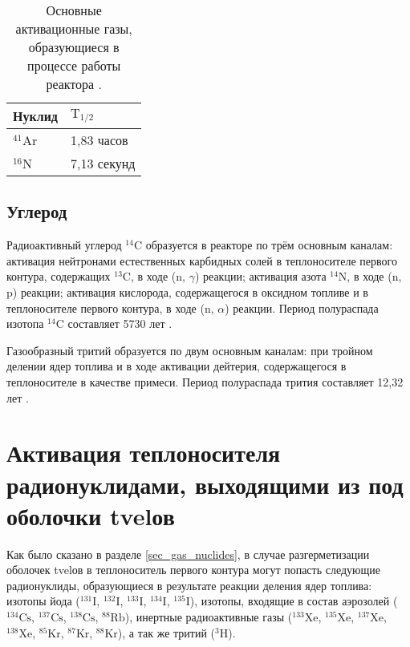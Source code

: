 \begin{table}[ht]
    \setlength{\extrarowheight}{1mm}
    \caption{Основные активационные газы, образующиеся в процессе работы реактора 
        \cite{bekman_nuclear}.}
    \label{table_active_gas}
    \centering
    \begin{tabular}{|M{0.4\textwidth}|M{0.4\textwidth}|}
    \hline Нуклид & $\text{T}_{1/2}$ \\
    \hline $^{41}\text{Ar}$ & 1,83 часов \\
    \hline $^{16}\text{N}$ & 7,13 секунд \\
    \hline 
    \end{tabular}
\end{table}

\subsection{Углерод}

Радиоактивный углерод $^{14}\text{C}$ образуется в реакторе по трём основным каналам: активация нейтронами естественных 
карбидных солей в теплоносителе первого контура, содержащих $^{13}\text{C}$, в ходе (n, $\gamma$) реакции; активация 
азота $^{14}\text{N}$, в ходе (n, p) реакции; активация кислорода, содержащегося в оксидном топливе и в теплоносителе 
первого контура, в ходе (n, $\alpha$) реакции. Период полураспада изотопа $^{14}\text{C}$ составляет 5730 лет 
\cite{bekman_nuclear}.

Газообразный тритий образуется по двум основным каналам: при тройном делении ядер топлива и в ходе активации дейтерия, 
содержащегося в теплоносителе в качестве примеси. Период полураспада трития составляет 12,32 лет \cite{bekman_nuclear}.

\section{Активация теплоносителя радионуклидами, выходящими из под оболочки \ac{tvel}ов}
\label{sec_tvel_nuclides}

Как было сказано в разделе \ref{sec_gas_nuclides}, в случае разгерметизации оболочек \ac{tvel}ов в теплоноситель 
первого контура могут попасть следующие радионуклиды, образующиеся в результате реакции деления ядер топлива: изотопы 
йода ($^{131}\text{I}$, $^{132}\text{I}$, $^{133}\text{I}$, $^{134}\text{I}$, $^{135}\text{I}$), изотопы, входящие в 
состав аэрозолей ($^{134}\text{Cs}$, $^{137}\text{Cs}$, $^{138}\text{Cs}$, $^{88}\text{Rb}$), инертные радиоактивные 
газы ($^{133}\text{Xe}$, $^{135}\text{Xe}$, $^{137}\text{Xe}$, $^{138}\text{Xe}$, $^{85}\text{Kr}$, $^{87}\text{Kr}$, 
$^{88}\text{Kr}$), а так же тритий ($^{3}\text{H}$).

